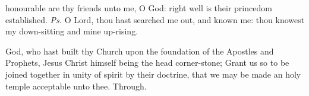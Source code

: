 %
%
%


\clearpage
{}

\introit
{} honourable are thy friends unto me, O God: right well is their princedom established. \textit{Ps.} O Lord, thou hast searched me out, and known me: thou knowest my down-sitting and mine up-rising.

\collect
{} God, who hast built thy Church upon the foundation of the Apostles and Prophets, Jesus Christ himself being the head corner-stone; Grant us so to be joined together in unity of spirit by their doctrine, that we may be made an holy temple acceptable unto thee. Through.

